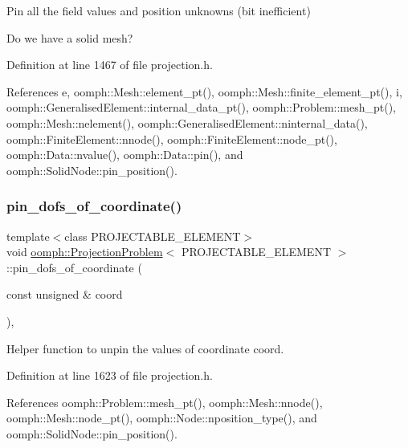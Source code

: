 Pin all the field values and position unknowns (bit inefficient) 

Do we have a solid mesh? 

Definition at line 1467 of file projection.\+h.



References e, oomph\+::\+Mesh\+::element\+\_\+pt(), oomph\+::\+Mesh\+::finite\+\_\+element\+\_\+pt(), i, oomph\+::\+Generalised\+Element\+::internal\+\_\+data\+\_\+pt(), oomph\+::\+Problem\+::mesh\+\_\+pt(), oomph\+::\+Mesh\+::nelement(), oomph\+::\+Generalised\+Element\+::ninternal\+\_\+data(), oomph\+::\+Finite\+Element\+::nnode(), oomph\+::\+Finite\+Element\+::node\+\_\+pt(), oomph\+::\+Data\+::nvalue(), oomph\+::\+Data\+::pin(), and oomph\+::\+Solid\+Node\+::pin\+\_\+position().

\mbox{\label{classoomph_1_1ProjectionProblem_ade05dce90814098ec0af15324b758730}} 
\subsubsection{\texorpdfstring{pin\+\_\+dofs\+\_\+of\+\_\+coordinate()}{pin\_dofs\_of\_coordinate()}}
{\footnotesize\ttfamily template$<$class P\+R\+O\+J\+E\+C\+T\+A\+B\+L\+E\+\_\+\+E\+L\+E\+M\+E\+NT$>$ \\
void \hyperlink{classoomph_1_1ProjectionProblem}{oomph\+::\+Projection\+Problem}$<$ P\+R\+O\+J\+E\+C\+T\+A\+B\+L\+E\+\_\+\+E\+L\+E\+M\+E\+NT $>$\+::pin\+\_\+dofs\+\_\+of\+\_\+coordinate (\begin{DoxyParamCaption}\item[{const unsigned \&}]{coord }\end{DoxyParamCaption})\hspace{0.3cm}{\ttfamily [inline]}, {\ttfamily [private]}}



Helper function to unpin the values of coordinate coord. 



Definition at line 1623 of file projection.\+h.



References oomph\+::\+Problem\+::mesh\+\_\+pt(), oomph\+::\+Mesh\+::nnode(), oomph\+::\+Mesh\+::node\+\_\+pt(), oomph\+::\+Node\+::nposition\+\_\+type(), and oomph\+::\+Solid\+Node\+::pin\+\_\+position().

